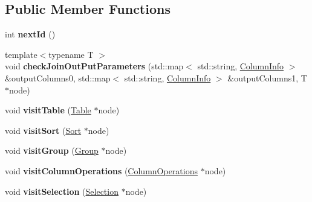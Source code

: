 \subsection*{Public Member Functions}
\begin{DoxyCompactItemize}
\item 
\hypertarget{class_semantic_checker_a7bfc82245e0af345db051ab8faea502e}{int {\bfseries next\+Id} ()}\label{class_semantic_checker_a7bfc82245e0af345db051ab8faea502e}

\item 
\hypertarget{class_semantic_checker_a31d420801c78aaf317a4b0094f9da3df}{{\footnotesize template$<$typename T $>$ }\\void {\bfseries check\+Join\+Out\+Put\+Parameters} (std\+::map$<$ std\+::string, \hyperlink{class_column_info}{Column\+Info} $>$ \&output\+Columns0, std\+::map$<$ std\+::string, \hyperlink{class_column_info}{Column\+Info} $>$ \&output\+Columns1, T $\ast$node)}\label{class_semantic_checker_a31d420801c78aaf317a4b0094f9da3df}

\item 
\hypertarget{class_semantic_checker_a915d3f58ab60a0e6ba6f248e3c81f0c5}{void {\bfseries visit\+Table} (\hyperlink{class_table}{Table} $\ast$node)}\label{class_semantic_checker_a915d3f58ab60a0e6ba6f248e3c81f0c5}

\item 
\hypertarget{class_semantic_checker_ae7cbd8a1c92f544a282de4b741d1e19e}{void {\bfseries visit\+Sort} (\hyperlink{class_sort}{Sort} $\ast$node)}\label{class_semantic_checker_ae7cbd8a1c92f544a282de4b741d1e19e}

\item 
\hypertarget{class_semantic_checker_a8dfc703b185f05a0f57749e1eb3c0a56}{void {\bfseries visit\+Group} (\hyperlink{class_group}{Group} $\ast$node)}\label{class_semantic_checker_a8dfc703b185f05a0f57749e1eb3c0a56}

\item 
\hypertarget{class_semantic_checker_a5bd2ca32010822a95a6ef0a78190fc91}{void {\bfseries visit\+Column\+Operations} (\hyperlink{class_column_operations}{Column\+Operations} $\ast$node)}\label{class_semantic_checker_a5bd2ca32010822a95a6ef0a78190fc91}

\item 
\hypertarget{class_semantic_checker_ac2825bf63bbda696b461166f915bacfe}{void {\bfseries visit\+Selection} (\hyperlink{class_selection}{Selection} $\ast$node)}\label{class_semantic_checker_ac2825bf63bbda696b461166f915bacfe}


\end{DoxyCompactItemize}

